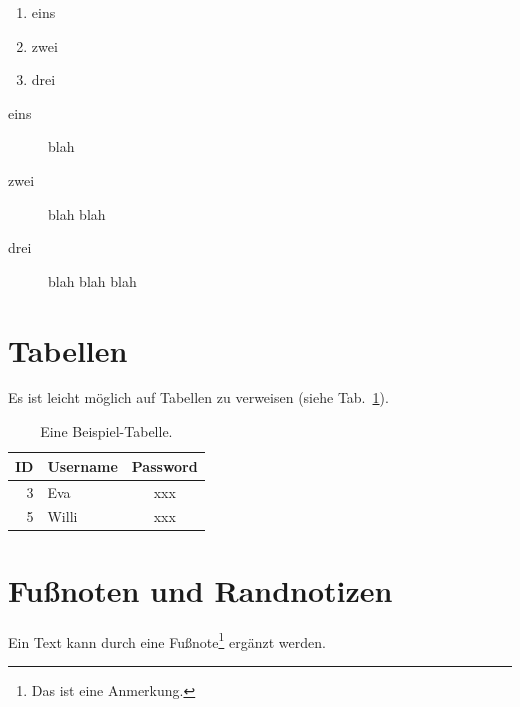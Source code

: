 \begin{appendix}
\begin{enumerate}
  \item eins
  \item zwei
  \item drei
\end{enumerate}


\begin{description}
\item[eins] blah
\item[zwei] blah blah
\item[drei] blah blah blah 
\end{description}

\newpage


\section{Tabellen}

Es ist leicht möglich auf Tabellen zu verweisen (siehe Tab.~\ref{UserTable}).

\begin{table}[htbp]
\begin{center}
\begin{tabular}{|r||l|c|} 
\hline 
ID 	& Username 	& Password 	\\ 
\hline 
\hline
3 	& Eva 		& xxx 		\\ 
\hline
5 	& Willi 	& xxx 		\\ 
\hline
\end{tabular}
\end{center}
\caption{Eine Beispiel-Tabelle.}
\label{UserTable}
\end{table}

\newpage


\section{Fußnoten und Randnotizen}
Ein Text kann durch eine Fußnote\footnote{Das ist eine Anmerkung.} ergänzt
werden.


\newpage



\end{appendix}
